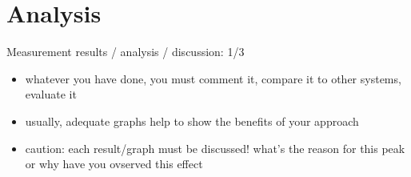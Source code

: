 
\chapter{Analysis}%
\label{sec:analysis}

Measurement results / analysis / discussion: 1/3

\begin{itemize}
    \item whatever you have done, you must comment it, compare it to other systems, evaluate it
    \item usually, adequate graphs help to show the benefits of your approach
    \item caution: each result/graph must be discussed! what's the reason for this peak or why have you ovserved this effect
\end{itemize}
